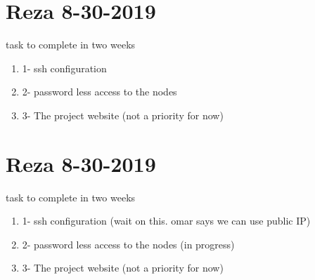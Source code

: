 \section{Reza 8-30-2019}
task to complete in two weeks


\begin{enumerate}
\item 1- ssh configuration 
\item 2- password less access to the nodes 
\item 3- The project website (not a priority for now) 
\end{enumerate}

\section{Reza 8-30-2019}
task to complete in two weeks


\begin{enumerate}
	\item 1- ssh configuration (wait on this. omar says we can use public IP) 
	\item 2- password less access to the nodes (in progress) 
\item 3- The project website (not a priority for now) 
\end{enumerate}



